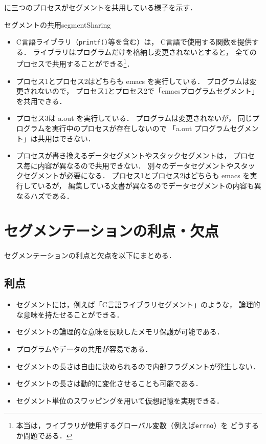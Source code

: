 に三つのプロセスがセグメントを共用している様子を示す．

{セグメントの共用}{segmentSharing}

\begin{itemize}
\item C言語ライブラリ（\texttt{printf()}等を含む）は，
C言語で使用する関数を提供する．
ライブラリはプログラムだけを格納し変更されないとすると，
全てのプロセスで共用することができる\footnote{
本当は，ライブラリが使用するグローバル変数（例えば\texttt{errno}）を
どうするか問題である．
}．

\item プロセス1とプロセス2はどちらも emacs を実行している．
プログラムは変更されないので，
プロセス1とプロセス2で「emacsプログラムセグメント」を共用できる．

\item プロセス3は a.out を実行している．
プログラムは変更されないが，
同じプログラムを実行中のプロセスが存在しないので
「a.out プログラムセグメント」は共用はできない．

\item プロセスが書き換えるデータセグメントやスタックセグメントは，
プロセス毎に内容が異なるので共用できない．
別々のデータセグメントやスタックセグメントが必要になる．
プロセス1とプロセス2はどちらも emacs を実行しているが，
編集している文書が異なるのでデータセグメントの内容も異なるハズである．
\end{itemize}

\section{セグメンテーションの利点・欠点}
セグメンテーションの利点と欠点を以下にまとめる．

\subsection*{利点}
\begin{itemize}
\item セグメントには，例えば「C言語ライブラリセグメント」のような，
論理的な意味を持たせることができる．
\item セグメントの論理的な意味を反映したメモリ保護が可能である．
\item プログラムやデータの共用が容易である．
\item セグメントの長さは自由に決められるので内部フラグメントが発生しない．
\item セグメントの長さは動的に変化させることも可能である．
\item セグメント単位のスワッピングを用いて仮想記憶を実現できる．
\end{itemize}

